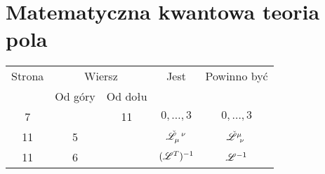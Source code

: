 \documentclass[a4paper,11pt]{article}
\begin{document}
\vspace{\spaceTwo}


\noindent













\newpage

\section{Matematyczna kwantowa teoria pola}

\vspace{\spaceTwo}




\vspace{0em}



\vspace{0em}






\begin{center}

  \begin{tabular}{|c|c|c|c|c|}
    \hline
    Strona & \multicolumn{2}{c|}{Wiersz} & Jest
                              & Powinno być \\ \cline{2-3}
    & Od góry & Od dołu & & \\
    \hline
    7   & & 11 & $0,\ldots,\!3$ & $0,\ldots, 3$ \\
    11  &  5 & & $\tensor{ \check{ \Lcal } }{ _{ \mu }^{ \nu } }$
           & $\tensor{ \check{ \Lcal } }{ ^{ \mu }_{ \nu } }$ \\
    11  &  6 & & $( \mathcal{L}^{ T } )^{ -1 }$ & $\mathcal{L}^{ -1 }$ \\
    \hline
  \end{tabular}

\end{center}
\end{document}
